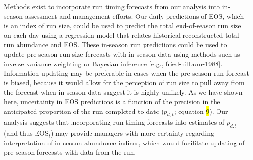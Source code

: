 \documentclass[12pt,]{book}
\theoremstyle{definition}
\theoremstyle{definition}
\theoremstyle{definition}
\theoremstyle{remark}
\begin{document}
Methods exist to incorporate run timing forecasts from our analysis into
in-season assessment and management efforts. Our daily predictions of
EOS, which is an index of run size, could be used to predict the total
end-of-season run size on each day using a regression model that relates
historical reconstructed total run abundance and EOS. These in-season
run predictions could be used to update pre-season run size forecasts
with in-season data using methods such as inverse variance weighting
\citep[e.g.,][]{walters-buckingham-1975} or Bayesian inference {[}e.g.,
fried-hilborn-1988{]}. Information-updating may be preferable in cases
when the pre-season run forecast is biased, because it would allow for
the perception of run size to pull away from the forecast when in-season
data suggest it is highly unlikely. As we have shown here, uncertainty
in EOS predictions is a function of the precision in the anticipated
proportion of the run completed-to-date (\(p_{d,t}\); equation \hl{9}).
Our analysis suggests that incorporating run timing forecasts into
estimates of \(p_{d,t}\) (and thus \(\text{EOS}_t\)) may provide
managers with more certainty regarding interpretation of in-season
abundance indices, which would facilitate updating of pre-season
forecasts with data from the run.
\end{document}
